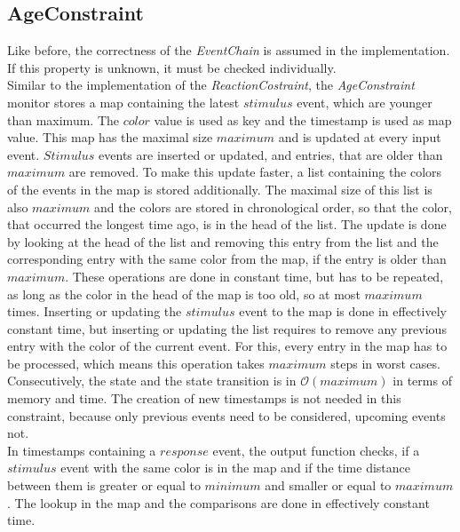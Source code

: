 \subsection{AgeConstraint}
	Like before, the correctness of the \textit{EventChain} is assumed in the implementation. If this property is unknown, it must be checked individually.\\
	Similar to the implementation of the \emph{ReactionCostraint}, the \emph{AgeConstraint} monitor stores a map containing the latest $stimulus$ event, which are younger than maximum. The $color$ value is used as key and the timestamp is used as map value. This map has the maximal size $maximum$ and is updated at every input event. $Stimulus$ events are inserted or updated, and entries, that are older than $maximum$ are removed. To make this update faster, a list containing the colors of the events in the map is stored additionally. The maximal size of this list is also $maximum$ and the colors are stored in chronological order, so that the color, that occurred the longest time ago, is in the head of the list. The update is done by looking at the head of the list and removing this entry from the list and the corresponding entry with the same color from the map, if the entry is older than $maximum$. These operations are done in constant time, but has to be repeated, as long as the color in the head of the map is too old, so at most $maximum$ times. Inserting or updating the $stimulus$ event to the map is done in effectively constant time, but inserting or updating the list requires to remove any previous entry with the color of the current event. For this, every entry in the map has to be processed, which means this operation takes $maximum$ steps in worst cases. Consecutively, the state and the state transition is in $\mathcal{O}(maximum)$ in terms of memory and time. The creation of new timestamps is not needed in this constraint, because only previous events need to be considered, upcoming events not.\\
	In timestamps containing a $response$ event, the output function checks, if a $stimulus$ event with the same color is in the map and if the time distance between them is greater or equal to $minimum$ and smaller or equal to $maximum$. The lookup in the map and the comparisons are done in effectively constant time.

